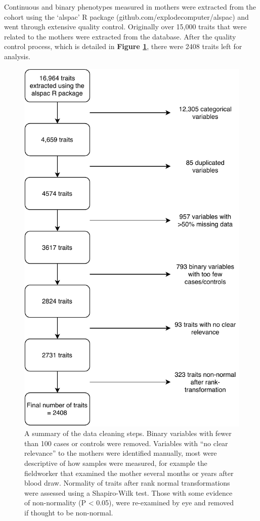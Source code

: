 \documentclass[11pt,oneside]{bristolthesis}
\begin{document}
Continuous and binary phenotypes measured in mothers were extracted from the cohort using the `alspac' R package (github.com/explodecomputer/alspac) and went through extensive quality control. Originally over 15,000 traits that were related to the mothers were extracted from the database. After the quality control process, which is detailed in \textbf{Figure \ref{fig:h2ewas-pheno-qc}}, there were 2408 traits left for analysis.


\begin{figure}

{\centering \includegraphics[width=0.75\linewidth,height=0.75\textheight]{figure/05-h2ewas/m2_data_cleaning} 

}

\caption{A summary of the data cleaning steps. Binary variables with fewer than 100 cases or controls were removed. Variables with ``no clear relevance'' to the mothers were identified manually, most were descriptive of how samples were measured, for example the fieldworker that examined the mother several months or years after blood draw. Normality of traits after rank normal transformations were assessed using a Shapiro-Wilk test. Those with some evidence of non-normality (P \textless{} 0.05), were re-examined by eye and removed if thought to be non-normal.}\label{fig:h2ewas-pheno-qc}
\end{figure}
\end{document}

